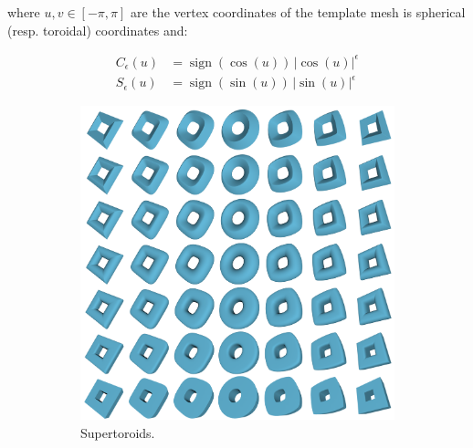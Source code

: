where $u,v \in [-\pi, \pi]$ are the vertex coordinates of the template mesh is spherical (resp. toroidal) coordinates and:

\begin{equation}
\begin{aligned}
C_\epsilon(u) &= \operatorname{sign}(\cos(u)) \, |\cos(u)|^\epsilon \\
S_\epsilon(u) &= \operatorname{sign}(\sin(u)) \, |\sin(u)|^\epsilon
\end{aligned}
\end{equation}


\begin{figure}[t]
  \centering
  \begin{subfigure}[t]{0.48\linewidth}
    \centering
    \includegraphics[width=\linewidth]{figs/topogen/toroids_overview.png}
    \caption{Supertoroids.}
    \label{fig:toroids-overview}
  \end{subfigure}
  \hfill
  \begin{subfigure}[t]{0.48\linewidth}
    \centering

\end{subfigure}
\end{figure}
